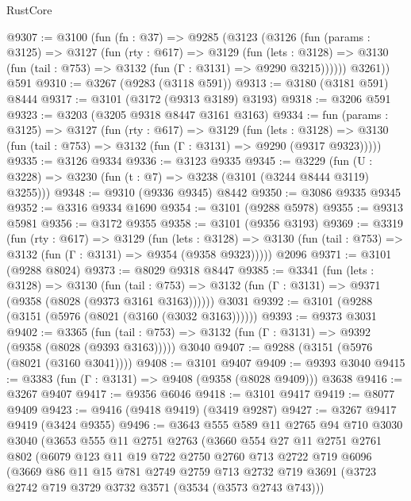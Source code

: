 \begin{lexlean}{RustCore}
\begin{coremodule}
@9307 := @3100
    (fun (fn : @37) =>
    @9285
      (@3123
        (@3126
          (fun (params : @3125) =>
          @3127
            (fun (rty : @617) =>
            @3129
              (fun (lets : @3128) =>
              @3130 (fun (tail : @753) => @3132 (fun (Γ : @3131) => @9290 @3215))))))
        @3261))
    @591
@9310 := @3267 (@9283 (@3118 @591))
@9313 := @3180 (@3181 @591) @8444
@9317 := @3101 (@3172 (@9313 @3189) @3193)
@9318 := @3206 @591
@9323 := @3203 (@3205 @9318 @8447 @3161 @3163)
@9334 := fun (params : @3125) =>
  @3127
    (fun (rty : @617) =>
    @3129
      (fun (lets : @3128) =>
      @3130 (fun (tail : @753) => @3132 (fun (Γ : @3131) => @9290 (@9317 @9323)))))
@9335 := @3126 @9334
@9336 := @3123 @9335
@9345 := @3229 (fun (U : @3228) => @3230 (fun (t : @7) => @3238 (@3101 (@3244 @8444 @3119) @3255)))
@9348 := @9310 (@9336 @9345) @8442
@9350 := @3086 @9335 @9345
@9352 := @3316 @9334 @1690
@9354 := @3101 (@9288 @5978)
@9355 := @9313 @5981
@9356 := @3172 @9355
@9358 := @3101 (@9356 @3193)
@9369 := @3319
    (fun (rty : @617) =>
    @3129
      (fun (lets : @3128) =>
      @3130 (fun (tail : @753) => @3132 (fun (Γ : @3131) => @9354 (@9358 @9323)))))
    @2096
@9371 := @3101 (@9288 @8024)
@9373 := @8029 @9318 @8447
@9385 := @3341
    (fun (lets : @3128) =>
    @3130
      (fun (tail : @753) => @3132 (fun (Γ : @3131) => @9371 (@9358 (@8028 (@9373 @3161 @3163))))))
    @3031
@9392 := @3101 (@9288 (@3151 (@5976 (@8021 (@3160 (@3032 @3163))))))
@9393 := @9373 @3031
@9402 := @3365
    (fun (tail : @753) => @3132 (fun (Γ : @3131) => @9392 (@9358 (@8028 (@9393 @3163)))))
    @3040
@9407 := @9288 (@3151 (@5976 (@8021 (@3160 @3041))))
@9408 := @3101 @9407
@9409 := @9393 @3040
@9415 := @3383 (fun (Γ : @3131) => @9408 (@9358 (@8028 @9409))) @3638
@9416 := @3267 @9407
@9417 := @9356 @6046
@9418 := @3101 @9417
@9419 := @8077 @9409
@9423 := @9416 (@9418 @9419) (@3419 @9287)
@9427 := @3267 @9417 @9419 (@3424 @9355)
@9496 := @3643
    @555
    @589
    @11
    @2765
    @94
    @710
    @3030
    @3040
    (@3653
      @555
      @11
      @2751
      @2763
      (@3660
        @554
        @27
        @11
        @2751
        @2761
        @802
        (@6079
          @123
          @11
          @19
          @722
          @2750
          @2760
          @713
          @2722
          @719
          @6096
          (@3669
            @86
            @11
            @15
            @781
            @2749
            @2759
            @713
            @2732
            @719
            @3691
            (@3723 @2742 @719 @3729 @3732 @3571 (@3534 (@3573 @2743 @743)))

\end{coremodule}
\end{lexlean}
